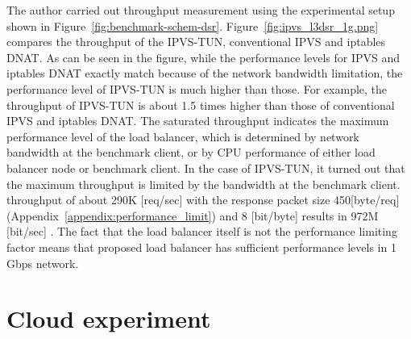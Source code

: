 The author carried out throughput measurement using the experimental setup shown in Figure~\ref{fig:benchmark-schem-dsr}.
Figure~\ref{fig:ipvs_l3dsr_1g.png} compares the throughput of the IPVS-TUN, conventional IPVS and iptables DNAT.
As can be seen in the figure, while the performance levels for IPVS and iptables DNAT exactly match because of the network bandwidth limitation, the performance level of IPVS-TUN is much higher than those.
For example, the throughput of IPVS-TUN is about 1.5 times higher than those of conventional IPVS and iptables DNAT.
The saturated throughput indicates the maximum performance level of the load balancer, which is determined by network bandwidth at the benchmark client, or by CPU performance of either load balancer node or benchmark client.
In the case of IPVS-TUN, it turned out that the maximum throughput is limited by the bandwidth at the benchmark client.
 throughput of about 290K [req/sec] with the response packet size 450[byte/req] (Appendix~\ref{appendix:performance_limit}) and 8 [bit/byte] results in 972M [bit/sec] .
The fact that the load balancer itself is not the performance limiting factor means that proposed load balancer has sufficient performance levels in 1 Gbps network.
  


\FloatBarrier

\section{Cloud experiment}

